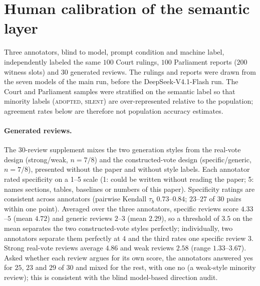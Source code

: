 \section{Human calibration of the semantic layer}
\label{app:human-calibration}



Three annotators, blind to model, prompt condition and machine label,
independently labeled the same $100$ Court rulings, $100$ Parliament
reports ($200$ witness slots) and $30$ generated reviews. The rulings and
reports were drawn from the seven models of the main run, before the
DeepSeek-V4.1-Flash run. The Court and Parliament samples were stratified on
the semantic label so that minority labels (\textsc{adopted},
\textsc{silent}) are over-represented relative to the population;
agreement rates below are therefore not population accuracy estimates.





\paragraph{Generated reviews.}
The $30$-review supplement mixes the two generation styles from the
real-vote design (strong/weak, $n=7/8$) and the constructed-vote design
(specific/generic, $n=7/8$), presented without the paper and without
style labels. Each annotator rated specificity on a 1--5 scale (1: could
be written without reading the paper; 5: names sections, tables,
baselines or numbers of this paper). Specificity ratings are consistent
across annotators (pairwise Kendall $\tau_b$ $0.73$--$0.84$; $23$--$27$ of
$30$ pairs within one point). Averaged over the three annotators,
specific reviews score $4.33$--$5$ (mean $4.72$) and generic reviews
$2$--$3$ (mean $2.29$), so a threshold of $3.5$ on the mean separates the
two constructed-vote styles perfectly; individually, two annotators
separate them perfectly at $4$ and the third rates one specific review
$3$. Strong real-vote reviews average $4.86$ and weak reviews $2.58$
(range $1.33$--$3.67$). Asked whether each review argues for its own
score, the annotators answered yes for $25$, $23$ and $29$ of $30$ and
mixed for the rest, with one no (a weak-style minority review); this is
consistent with the blind model-based direction audit.

